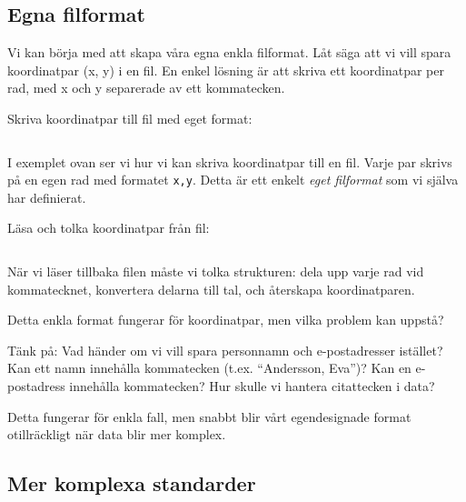 \subsection{Egna filformat}

Vi kan börja med att skapa våra egna enkla filformat. Låt säga att vi vill spara koordinatpar (x, y) i en fil. En enkel lösning är att skriva ett koordinatpar per rad, med x och y separerade av ett kommatecken.

\begin{frame}[fragile]
  \begin{example}[xy.py]
    Skriva koordinatpar till fil med eget format:
    \inputminted[firstline=3,lastline=10,firstnumber=3]{python}{examples/xy.py}
  \end{example}
\end{frame}

I exemplet ovan ser vi hur vi kan skriva koordinatpar till en fil. Varje par skrivs på en egen rad med formatet \texttt{x,y}. Detta är ett enkelt \emph{eget filformat} som vi själva har definierat.

\begin{frame}[fragile]
  \begin{example}[xy.py]
    Läsa och tolka koordinatpar från fil:
    \inputminted[firstline=12,lastline=26,firstnumber=12]{python}{examples/xy.py}
  \end{example}
\end{frame}

När vi läser tillbaka filen måste vi tolka strukturen: dela upp varje rad vid kommatecknet, konvertera delarna till tal, och återskapa koordinatparen.

\begin{frame}
  \begin{exercise}
    Detta enkla format fungerar för koordinatpar, men vilka problem kan uppstå?

    Tänk på: Vad händer om vi vill spara personnamn och e-postadresser istället?
    Kan ett namn innehålla kommatecken (t.ex. \enquote{Andersson, Eva})?
    Kan en e-postadress innehålla kommatecken? Hur skulle vi hantera
    citattecken i data?
  \end{exercise}
\end{frame}

Detta fungerar för enkla fall, men snabbt blir vårt egendesignade format otillräckligt när data blir mer komplex.

\subsection{Mer komplexa standarder}

